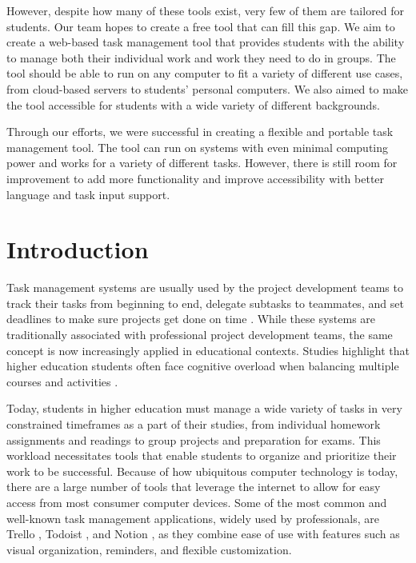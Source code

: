 \documentclass[11pt,oneside]{article}
\begin{document}
However, despite how many of these tools exist, very few of them are tailored for students. Our team hopes to create a free tool that can fill this gap. We aim to create a web-based task management tool that provides students with the ability to manage both their individual work and work they need to do in groups. The tool should be able to run on any computer to fit a variety of different use cases, from cloud-based servers to students' personal computers. We also aimed to make the tool accessible for students with a wide variety of different backgrounds.

Through our efforts, we were successful in creating a flexible and portable task management tool. The tool can run on systems with even minimal computing power and works for a variety of different tasks. However, there is still room for improvement to add more functionality and improve accessibility with better language and task input support.

\clearpage
\tableofcontents
\clearpage

\section{Introduction}

Task management systems are usually used by the project development teams to track their tasks from beginning to end, delegate subtasks to teammates, and set deadlines to make sure projects get done on time \citep{nurzi2022web}. While these systems are traditionally associated with professional project development teams, the same concept is now increasingly applied in educational contexts. Studies highlight that higher education students often face cognitive overload when balancing multiple courses and activities \citep{kirschner2013learners}. 

Today, students in higher education must manage a wide variety of tasks in very constrained timeframes as a part of their studies, from individual homework assignments and readings to group projects and preparation for exams. This workload necessitates tools that enable students to organize and prioritize their work to be successful. Because of how ubiquitous computer technology is today, there are a large number of tools that leverage the internet to allow for easy access from most consumer computer devices. Some of the most common and well-known task management applications, widely used by professionals, are Trello \citep{shchetynina2022trello}, Todoist \citep{bourbon2021time}, and Notion \citep{reach2022notion}, as they combine ease of use with features such as visual organization, reminders, and flexible customization.
\end{document}
